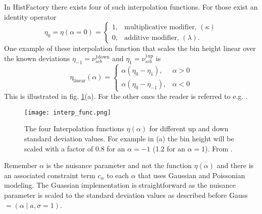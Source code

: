 In HistFactory there exists four of such interpolation functions. For those exist an identity operator 
\begin{equation}
    \eta_0=\eta (\alpha=0) =
    \begin{cases}
        1 ,& \text{multiplicative modifier, } (\kappa) \\
        0 ,& \text{additive modifier, } (\lambda).
    \end{cases}
\end{equation}
One example of these interpolation function that scales the bin height linear over the known deviations $\eta_{-1}=\nu_{scb}^\mathrm{1down}$ and $\eta_{1}=\nu_{scb}^\mathrm{1up}$ is
\begin{equation}
    \eta_\mathrm{linear}(\alpha)=
    \begin{cases}
        \alpha(\eta_0 - \eta_1) ,& \alpha>0\\
        \alpha(\eta_0 - \eta_{-1}) ,& \alpha<0
    \end{cases}
\end{equation}
This is illustrated in fig. \ref{fig:interp_func}(a). For the other ones the reader is referred to e.g. \citep{heinrich2019searches}. 
\begin{figure}
    \centering
    \texttt{[image: interp\_func.png]}
        \caption[]{The four Interpolation functions $\eta(\alpha)$ for different up and down standard deviation values. For example in (a) the bin height will be scaled with a factor of 0.8 for an $\alpha=-1$ (1.2 for an $\alpha=1$). From \citep{cranmer2012histfactory}.}
    \label{fig:interp_func}    
\end{figure}
Remember $\alpha$ is the nuisance parameter and not the function $\eta(\alpha)$ and there is an associated constraint term $c_\alpha$ to each $\alpha$ that uses Gaussian and Poissonian modeling. The Guassian implementation is straightforward as the nuisance parameter is scaled to the standard deviation values as described before Gauss$=(\alpha \mid a, \sigma=1)$. 

